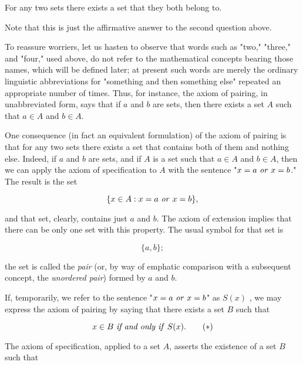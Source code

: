 \begin{named}  For any two sets there exists a set that they both belong to.
\end{named}


Note that this is just the affirmative answer to the second question above.

To reassure worriers, let us hasten to observe that words such as "two," "three," and "four," used above, do not refer to the mathematical concepts bearing those names, which will be defined later; at present such words are merely the ordinary linguistic abbreviations for "something and then something else" repeated an appropriate number of times. Thus, for instance, the axiom of pairing, in unabbreviated form, says that if $a$ and $b$ are sets, then there exists a set $A$ such that $a \in A$ and $b \in A$.

One consequence (in fact an equivalent formulation) of the axiom of pairing is that for any two sets there exists a set that contains both of them and nothing else. Indeed, if $a$ and $b$ are sets, and if $A$ is a set such that $a \in A$ and $b \in A$, then we can apply the axiom of specification to $A$ with the sentence "$x = a \text{ \textit{or} } x = b$." The result is the set 

\begin{equation*}
\{ x \in A: x = a \text{ \textit{or} } x = b \},
\end{equation*}

and that set, clearly, contains just $a$ and $b$. The axiom of extension implies that there can be only one set with this property. The usual symbol for that set is

\begin{equation*}
\{ a, b \};
\end{equation*}

the set is called the \textit{pair} (or, by way of emphatic comparison with a subsequent concept, the \textit{unordered pair}) formed by $a$ and $b$. 

If, temporarily, we refer to the sentence "$x = a \text{ \textit{or} } x = b$" as $S(x)$ , we may express the axiom of pairing by saying that there exists a set $B$ such that 

\begin{equation}
\label{eq3.1}
x \in B \text{ \textit{if and only if} } S(x). \tag{$\ast$}
\end{equation}

The axiom of specification, applied to a set $A$, asserts the existence of a set $B$ such that 

